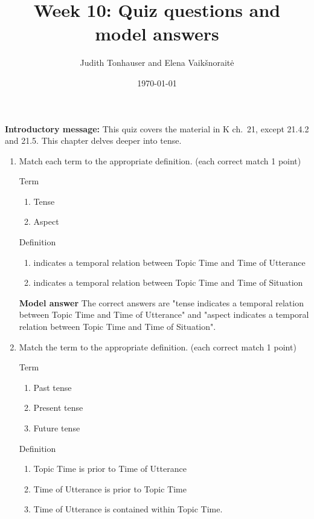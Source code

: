 \documentclass[a4,11pt]{article}
\title{Week 10: Quiz questions and model answers}
\author{Judith Tonhauser and Elena Vaik\v snorait\.{e} }
\date{\today}
\newcommand{\6}{\mbox{$[\hspace*{-.6mm}[$}}
\newcommand{\9}{\mbox{$]\hspace*{-.6mm}]$}}
\begin{document}
\maketitle

{\bf Introductory message:} This quiz covers the material in K ch.\ 21, except 21.4.2 and 21.5. This chapter delves deeper into tense. 

\begin{enumerate}[leftmargin = 12pt]

\item Match each term to the appropriate definition. (each correct match 1 point)

Term
\begin{enumerate}[noitemsep]
\item Tense
\item Aspect
\end{enumerate}

Definition

\begin{enumerate}[noitemsep]
\item indicates a temporal relation between Topic Time and Time of Utterance
\item indicates a temporal relation between Topic Time and Time of Situation
\end{enumerate}

{\bf Model answer} The correct answers are "tense indicates a temporal relation between Topic Time and Time of Utterance" and "aspect indicates a temporal relation between Topic Time and Time of Situation".

\item Match the term to the appropriate definition. (each correct match 1 point)

Term

\begin{enumerate}[noitemsep]
\item Past tense 
\item Present tense 
\item Future tense
\end{enumerate}

Definition

\begin{enumerate}[noitemsep]
\item Topic Time is prior to Time of Utterance
\item Time of Utterance is prior to Topic Time 
\item Time of Utterance  is contained within Topic Time.
\end{enumerate}



\end{enumerate}
\end{document}

